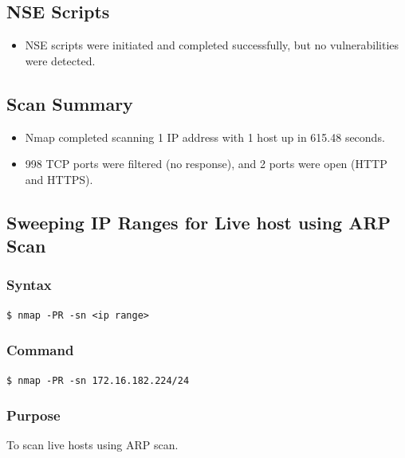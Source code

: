 \documentclass[11pt]{article}
\begin{document}
\subsection*{NSE Scripts}
\begin{itemize}
    \item NSE scripts were initiated and completed successfully, but no vulnerabilities were detected.
\end{itemize}

\subsection*{Scan Summary}
\begin{itemize}
    \item Nmap completed scanning 1 IP address with 1 host up in 615.48 seconds.
    \item 998 TCP ports were filtered (no response), and 2 ports were open (HTTP and HTTPS).
\end{itemize}



\subsection{Sweeping IP Ranges for Live host using ARP Scan}

\subsubsection{Syntax}
\begin{verbatim}
$ nmap -PR -sn <ip range>
\end{verbatim}

\subsubsection*{Command}
\begin{verbatim}
$ nmap -PR -sn 172.16.182.224/24
\end{verbatim}

\subsubsection*{Purpose}
To scan live hosts using ARP scan.
\end{document}
